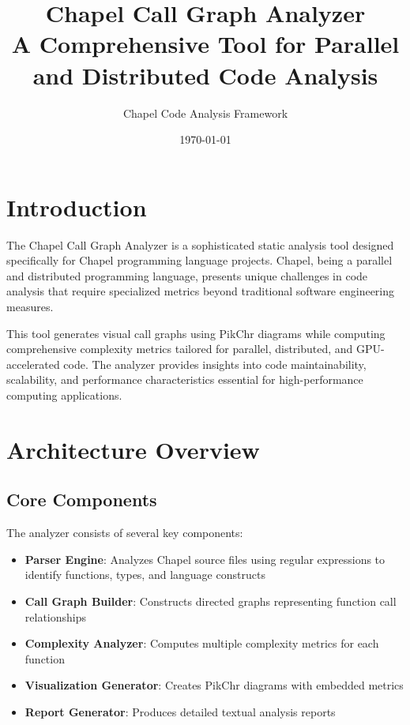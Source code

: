 \documentclass[11pt,a4paper]{article}
\title{Chapel Call Graph Analyzer\\
\large A Comprehensive Tool for Parallel and Distributed Code Analysis}
\author{Chapel Code Analysis Framework}
\date{\today}
\begin{document}
\maketitle

\tableofcontents
\newpage

\section{Introduction}

The Chapel Call Graph Analyzer is a sophisticated static analysis tool designed specifically for Chapel programming language projects. Chapel, being a parallel and distributed programming language, presents unique challenges in code analysis that require specialized metrics beyond traditional software engineering measures.

This tool generates visual call graphs using PikChr diagrams while computing comprehensive complexity metrics tailored for parallel, distributed, and GPU-accelerated code. The analyzer provides insights into code maintainability, scalability, and performance characteristics essential for high-performance computing applications.

\section{Architecture Overview}

\subsection{Core Components}

The analyzer consists of several key components:

\begin{itemize}
    \item \textbf{Parser Engine}: Analyzes Chapel source files using regular expressions to identify functions, types, and language constructs
    \item \textbf{Call Graph Builder}: Constructs directed graphs representing function call relationships
    \item \textbf{Complexity Analyzer}: Computes multiple complexity metrics for each function
    \item \textbf{Visualization Generator}: Creates PikChr diagrams with embedded metrics
    \item \textbf{Report Generator}: Produces detailed textual analysis reports
\end{itemize}
\end{document}

